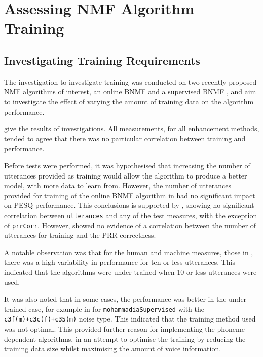 \clearpage{}


\section{Assessing \acl{NMF} Algorithm Training}


\subsection{Investigating Training Requirements}

The investigation to investigate training was conducted on two recently
proposed \ac{NMF} algorithms of interest, an online \ac{BNMF} and
a supervised \ac{BNMF} \cite{mohammadiha2013supervised}, and aim
to investigate the effect of varying the amount of training data on
the algorithm performance.

give the results of investigations. All measurements, for all enhancement
methods, tended to agree that there was no particular correlation
between training and performance.

Before tests were performed, it was hypothesised that increasing the
number of utterances provided as training would allow the algorithm
to produce a better model, with more data to learn from. However,
the number of utterances provided for training of the online \ac{BNMF}
algorithm in  had no significant impact on
\ac{PESQ} performance. This conclusions is supported by ,
showing no significant correlation between \lstinline!utterances!
and any of the test measures, with the exception of \lstinline!prrCorr!.
However,  showed no evidence of a correlation
between the number of utterances for training and the \ac{PRR} correctness.

A notable observation was that for the human and machine measures,
those in ,
there was a high variability in performance for ten or less utterances.
This indicated that the algorithms were under-trained when 10 or less
utterances were used.

It was also noted that in some cases, the performance was better in
the under-trained case, for example in  for
\lstinline!mohammadiaSupervised! with the \lstinline!c3f(m)+c3c(f)+c35(m)!
noise type. This indicated that the training method used was not optimal.
This provided further reason for implementing the phoneme-dependent
algorithms, in an attempt to optimise the training by reducing the
training data size whilst maximising the amount of voice information.


